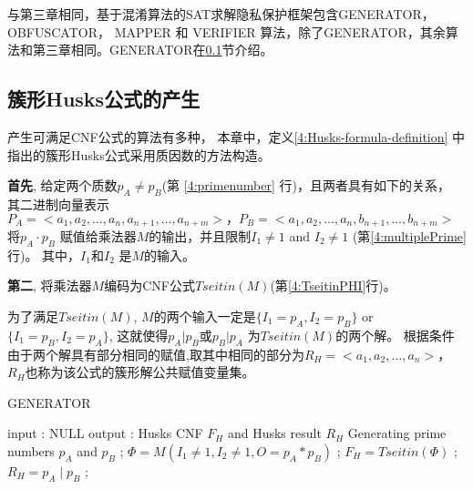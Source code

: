 与第三章相同，基于混淆算法的SAT求解隐私保护框架包含GENERATOR， OBFUSCATOR， MAPPER 和 VERIFIER 算法，除了GENERATOR，其余算法和第三章相同。GENERATOR在\ref{4:genhusk}节介绍。

\subsection{簇形Husks公式的产生}\label{4:genhusk}
产生可满足CNF公式的算法有多种\cite{microgenSAT,genSAT}，
本章中，定义\ref{4:Husks-formula-definition} 中指出的簇形Husks公式采用质因数的方法构造\cite{genSAT}。

%
\textbf{首先},
给定两个质数$p_A \neq p_B$(第 \ref{4:primenumber} 行)，且两者具有如下的关系，
其二进制向量表示$P_A=<a_1,a_2,\dots,a_n,a_{n+1},\dots,a_{n+m}>，
P_B=<a_1,a_2,…,a_n,b_{n+1},…,b_{n+m}>$
将$p_A \cdot p_B$ 赋值给乘法器$M$的输出，并且限制$I_1\ne 1$ and  $I_2\ne 1$ (第\ref{4:multiplePrime}行)。
其中，$I_1$和$I_2$ 是$M$的输入。

\textbf{第二},
将乘法器$M$编码为CNF公式$Tseitin(M)$(第\ref{4:TseitinPHI}行)。

为了满足$Tseitin(M)$, $M$的两个输入一定是$\{I_1=p_A,I_2=p_B\}$ or $\{I_1=p_B,I_2=p_A\}$,
这就使得$p_A|p_B$或$p_B|p_A$ 为$Tseitin(M)$的两个解。
根据条件由于两个解具有部分相同的赋值,取其中相同的部分为$R_H=<a_1,a_2,\dots,a_n>$，
$R_H$也称为该公式的簇形解公共赋值变量集。

\begin{algorithm*}[b]
\caption{GENERATOR}
\label{4:algo2_gen}
\begin{algorithmic}[1]
\STATE input : NULL
\STATE output : Husks CNF $F_H$ and Husks result $R_H$
\STATE Generating prime numbers $p_A$ and $p_B$  ; \label{4:primenumber}
\STATE $\Phi= M(I_1 \neq 1, I_2\neq 1, O=p_A*p_B)$ ;\label{4:multiplePrime3MVMV}
\STATE $F_H=Tseitin(\Phi)$ ;\label{4:TseitinPHI}
\STATE $R_H=p_A\mid p_B$ ;
\end{algorithmic}
\end{algorithm*}

